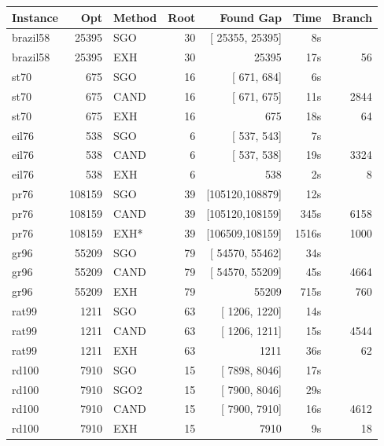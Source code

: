 \documentclass[a4paper,11pt,twoside]{book}
\begin{document}
\begin{multicols}{2}
\vfill
\begin{center}
\small
\begin{tabular}{|lrlrrrr|}
\hline
{\bf Instance} & {\bf Opt} & {\bf Method} & {\bf Root} & {\bf Found Gap} & {\bf Time} & {\bf Branch} \\
\hline
\hline
brazil58     &    25395 &  SGO &  30 & [ 25355, 25395] &     8s & \\
brazil58     &    25395 &  EXH &  30 &          25395  &    17s &      56 \\
st70         &      675 &  SGO &  16 & [   671,   684] &     6s & \\
st70         &      675 & CAND &  16 & [   671,   675] &    11s &    2844 \\
st70         &      675 &  EXH &  16 &            675  &    18s &      64 \\
eil76        &      538 &  SGO &   6 & [   537,   543] &     7s & \\
eil76        &      538 & CAND &   6 & [   537,   538] &    19s &    3324 \\
eil76        &      538 &  EXH &   6 &            538  &     2s &       8 \\
pr76         &   108159 &  SGO &  39 & [105120,108879] &    12s & \\
pr76         &   108159 & CAND &  39 & [105120,108159] &   345s &    6158 \\
pr76         &   108159 & EXH* &  39 & [106509,108159] &  1516s &    1000 \\
gr96         &    55209 &  SGO &  79 & [ 54570, 55462] &    34s & \\
gr96         &    55209 & CAND &  79 & [ 54570, 55209] &    45s &    4664 \\
gr96         &    55209 &  EXH &  79 &           55209 &   715s &     760 \\
rat99        &     1211 &  SGO &  63 & [  1206,  1220] &    14s & \\
rat99        &     1211 & CAND &  63 & [  1206,  1211] &    15s &    4544 \\
rat99        &     1211 &  EXH &  63 &           1211  &    36s &      62   \\
rd100        &     7910 &  SGO &  15 & [  7898,  8046] &    17s & \\
rd100        &     7910 & SGO2 &  15 & [  7900,  8046] &    29s & \\
rd100        &     7910 & CAND &  15 & [  7900,  7910] &    16s &    4612 \\
rd100        &     7910 &  EXH &  15 &           7910  &     9s &      18 \\

\end{tabular}
\end{center}
\end{multicols}
\end{document}
